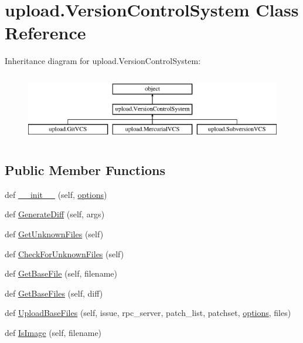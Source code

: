 \hypertarget{classupload_1_1_version_control_system}{}\section{upload.\+Version\+Control\+System Class Reference}
\label{classupload_1_1_version_control_system}
Inheritance diagram for upload.\+Version\+Control\+System\+:\begin{figure}[H]
\begin{center}
\leavevmode
\includegraphics[height=2.994653cm]{classupload_1_1_version_control_system}
\end{center}
\end{figure}
\subsection*{Public Member Functions}
\begin{DoxyCompactItemize}
\item 
def \hyperlink{classupload_1_1_version_control_system_ace97e5785a2b40011404ae6fbb956ecf}{\+\_\+\+\_\+init\+\_\+\+\_\+} (self, \hyperlink{classupload_1_1_version_control_system_a4d57d043bc408887b94269fe4cea9556}{options})
\item 
def \hyperlink{classupload_1_1_version_control_system_aa5eb260c96e7016dab36b5fc136c9f49}{Generate\+Diff} (self, args)
\item 
def \hyperlink{classupload_1_1_version_control_system_a56a60e56aa9aff3df4001d2f84cab884}{Get\+Unknown\+Files} (self)
\item 
def \hyperlink{classupload_1_1_version_control_system_ad2923d691a1b1047e9359c5b7c1c103f}{Check\+For\+Unknown\+Files} (self)
\item 
def \hyperlink{classupload_1_1_version_control_system_adfd9d4ecba422102233a2ba13e5bfaf5}{Get\+Base\+File} (self, filename)
\item 
def \hyperlink{classupload_1_1_version_control_system_a812c3b3daf90c88b015fa4b26252e291}{Get\+Base\+Files} (self, diff)
\item 
def \hyperlink{classupload_1_1_version_control_system_a7e334f967301b9e85e5a9c39f5036823}{Upload\+Base\+Files} (self, issue, rpc\+\_\+server, patch\+\_\+list, patchset, \hyperlink{classupload_1_1_version_control_system_a4d57d043bc408887b94269fe4cea9556}{options}, files)
\item 
def \hyperlink{classupload_1_1_version_control_system_a846889ecd2ef40870b456ddb5b349e02}{Is\+Image} (self, filename)
\end{DoxyCompactItemize}
